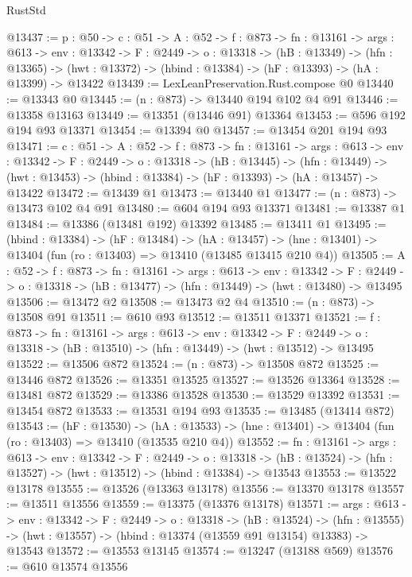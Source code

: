 \begin{lexlean}{RustStd}
\begin{coremodule}
@13437 := {p : @50} ->
  {c : @51} ->
  {A : @52} ->
  {f : @873} ->
  {fn : @13161} ->
  {args : @613} ->
  {env : @13342} ->
  {F : @2449} ->
  {o : @13318} ->
  (hB : @13349) ->
  (hfn : @13365) -> (hwt : @13372) -> (hbind : @13384) -> (hF : @13393) -> (hA : @13399) -> @13422
@13439 := LexLeanPreservation.Rust.compose @0
@13440 := @13343 @0
@13445 := (n : @873) -> @13440 @194 @102 @4 @91
@13446 := @13358 @13163
@13449 := @13351 (@13446 @91) @13364
@13453 := @596 @192 @194 @93 @13371
@13454 := @13394 @0
@13457 := @13454 @201 @194 @93
@13471 := {c : @51} ->
  {A : @52} ->
  {f : @873} ->
  {fn : @13161} ->
  {args : @613} ->
  {env : @13342} ->
  {F : @2449} ->
  {o : @13318} ->
  (hB : @13445) ->
  (hfn : @13449) -> (hwt : @13453) -> (hbind : @13384) -> (hF : @13393) -> (hA : @13457) -> @13422
@13472 := @13439 @1
@13473 := @13440 @1
@13477 := (n : @873) -> @13473 @102 @4 @91
@13480 := @604 @194 @93 @13371
@13481 := @13387 @1
@13484 := @13386 (@13481 @192) @13392
@13485 := @13411 @1
@13495 := (hbind : @13384) ->
  (hF : @13484) ->
  (hA : @13457) -> (hne : @13401) -> @13404 (fun (ro : @13403) => @13410 (@13485 @13415 @210 @4))
@13505 := {A : @52} ->
  {f : @873} ->
  {fn : @13161} ->
  {args : @613} ->
  {env : @13342} ->
  {F : @2449} -> {o : @13318} -> (hB : @13477) -> (hfn : @13449) -> (hwt : @13480) -> @13495
@13506 := @13472 @2
@13508 := @13473 @2 @4
@13510 := (n : @873) -> @13508 @91
@13511 := @610 @93
@13512 := @13511 @13371
@13521 := {f : @873} ->
  {fn : @13161} ->
  {args : @613} ->
  {env : @13342} ->
  {F : @2449} -> {o : @13318} -> (hB : @13510) -> (hfn : @13449) -> (hwt : @13512) -> @13495
@13522 := @13506 @872
@13524 := (n : @873) -> @13508 @872
@13525 := @13446 @872
@13526 := @13351 @13525
@13527 := @13526 @13364
@13528 := @13481 @872
@13529 := @13386 @13528
@13530 := @13529 @13392
@13531 := @13454 @872
@13533 := @13531 @194 @93
@13535 := @13485 (@13414 @872)
@13543 := (hF : @13530) ->
  (hA : @13533) -> (hne : @13401) -> @13404 (fun (ro : @13403) => @13410 (@13535 @210 @4))
@13552 := {fn : @13161} ->
  {args : @613} ->
  {env : @13342} ->
  {F : @2449} ->
  {o : @13318} -> (hB : @13524) -> (hfn : @13527) -> (hwt : @13512) -> (hbind : @13384) -> @13543
@13553 := @13522 @13178
@13555 := @13526 (@13363 @13178)
@13556 := @13370 @13178
@13557 := @13511 @13556
@13559 := @13375 (@13376 @13178)
@13571 := {args : @613} ->
  {env : @13342} ->
  {F : @2449} ->
  {o : @13318} ->
  (hB : @13524) ->
  (hfn : @13555) -> (hwt : @13557) -> (hbind : @13374 (@13559 @91 @13154) @13383) -> @13543
@13572 := @13553 @13145
@13574 := @13247 (@13188 @569)
@13576 := @610 @13574 @13556

\end{coremodule}
\end{lexlean}
